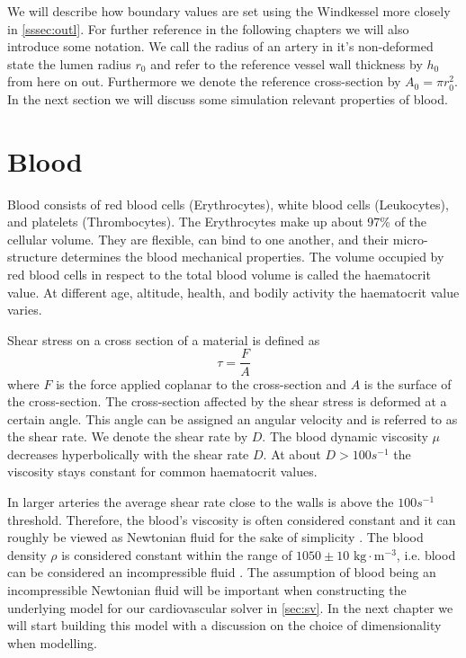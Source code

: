 \documentclass[a4paper, oneside]{discothesis}
\begin{document}
We will describe how boundary values are set using the Windkessel more closely in \autoref{sssec:outl}.
For further reference in the following chapters we will also introduce some notation.
We call the radius of an artery in it's non-deformed state the lumen radius $r_0$ and refer to the reference vessel wall thickness by $h_0$ from here on out.
Furthermore we denote the reference cross-section by $A_0 = \pi r_0^2$.
In the next section we will discuss some simulation relevant properties of blood.

\section{Blood} \label{sec:b}
Blood consists of red blood cells (Erythrocytes), white blood cells (Leukocytes), and platelets (Thrombocytes).
The Erythrocytes make up about 97\% of the cellular volume.
They are flexible, can bind to one another, and their micro-structure determines the blood mechanical properties.
The volume occupied by red blood cells in respect to the total blood volume is called the haematocrit value.
At different age, altitude, health, and bodily activity the haematocrit value varies.

Shear stress on a cross section of a material is defined as 
\begin{equation}
	\tau = \frac{F}{A}
\end{equation}
where $F$ is the force applied coplanar to the cross-section and $A$ is the surface of the cross-section.
The cross-section affected by the shear stress is deformed at a certain angle. 
This angle can be assigned an angular velocity and is referred to as the shear rate.
We denote the shear rate by $D$. \cite{köppl2023dimension}
The blood dynamic viscosity $\mu$ decreases hyperbolically with the shear rate $D$.
At about $D > 100s^{-1}$ the viscosity stays constant for common haematocrit values.

In larger arteries the average shear rate close to the walls is above the $100s^{-1}$ threshold. \cite{MCDbook}
Therefore, the blood's viscosity is often considered constant and it can roughly be viewed as Newtonian fluid for the sake of simplicity \cite{fung1996biomechanics,guyton2006textbook,MCDbook,pedley_1980,zamir2000physics,zamir2006physics}. 
The blood density $\rho$ is considered constant within the range of $1050 \pm 10 \text{ kg}\cdot\text{m}^{-3}$, i.e. blood can be considered an incompressible fluid \cite{PMID:2658951,kenner1977continuous,helmig1997multiphase}.
The assumption of blood being an incompressible Newtonian fluid will be important when constructing the underlying model for our cardiovascular solver in \autoref{sec:sv}. In the next chapter we will start building this model with a discussion on the choice of dimensionality when modelling.
\end{document}
